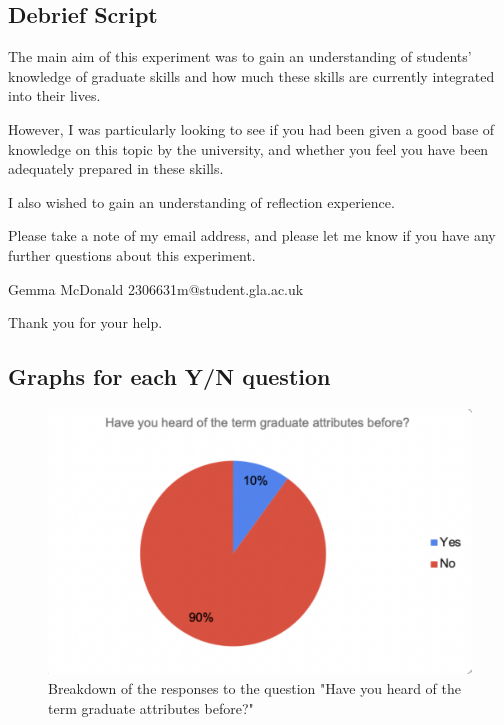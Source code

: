 \documentclass{l4proj}
\begin{document}
\begin{appendices}
\subsection{Debrief Script}
The main aim of this experiment was to gain an understanding of students' knowledge of graduate skills and how much these skills are currently integrated into their lives. 

However, I was particularly looking to see if you had been given a good base of knowledge on this topic by the university, and whether you feel you have been adequately prepared in these skills. 

I also wished to gain an understanding of reflection experience. 

Please take a note of my email address, and please let me know if you have any further questions about this experiment.

Gemma McDonald
2306631m@student.gla.ac.uk

Thank you for your help.


\subsection{Graphs for each Y/N question}

\begin{figure}[H]
    \begin{centering}
    \includegraphics[scale=0.5]{images/GradAttr-1.pdf}
    \caption{Breakdown of the responses to the question "Have you heard of the term graduate attributes before?"}
    \label{fig: GradAttr-1}
    \end{centering}
\end{figure}


\end{appendices}
\end{document}
